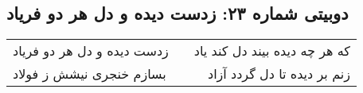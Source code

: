 \begin{center}
\section*{دوبیتی شماره ۲۳: زدست دیده و دل هر دو فریاد}
\label{sec:023}
\begin{longtable}{l p{0.5cm} r}
زدست دیده و دل هر دو فریاد
&&
که هر چه دیده بیند دل کند یاد
\\
بسازم خنجری نیشش ز فولاد
&&
زنم بر دیده تا دل گردد آزاد
\\
\end{longtable}
\end{center}
